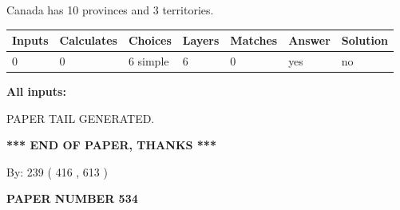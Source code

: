 \documentclass[12pt]{article}
\begin{document}
 
\noindent{}
 
 
Canada has 10  provinces and 3 territories.
 
 
\noindent{}
 
 
   
   
   
   
\noindent\begin{tabular}{|l|l|l|l|l|l|l|}
 \hline
Inputs & Calculates & Choices & Layers & Matches & Answer & Solution \\ \hline
 0  & 
 0  & 
 6
  simple  
  & 
 6  & 
 0  & 
  yes & 
  no 
  \\ \hline
 \end{tabular}
   
   
   
   
\noindent{}
   
   
   
   
\noindent\vspace{0.1in}\hspace{-0.08in} {\textbf{\Large{All inputs: }}}
   
   
   
   
   
   
 \vspace{0.2in}
 
   
   
\vspace{2.0in} PAPER TAIL GENERATED.
   
   
   
   
\vspace{1.0in} 
{\textbf{\large{ *** END OF PAPER, THANKS *** }}} 
   
   
\hspace{1.0in} By: 
 239 ( 416 ,  613 )
   
   
   
   
\newpage 
\setcounter{page}{ 
   534001 } 
   
   
   
   
 {\textbf{ \Large{ PAPER NUMBER  534  }}}
   
   
\vspace{0.2in}
   
   
   
\end{document}
